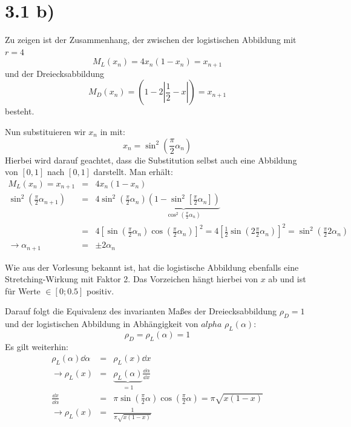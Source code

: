 \section*{3.1 b)}

Zu zeigen ist der Zusammenhang, der zwischen der logistischen Abbildung mit $r = 4$
\begin{equation}
 M_L(x_n) = 4x_n(1-x_n) = x_{n+1}
 \label{eqn:ml}
\end{equation}
und der Dreiecksabbildung
\begin{equation}
 \label{eqn:md}
 M_D(x_n) = \left(1-2\left|\frac{1}{2}-x\right|\right) = x_{n+1}
\end{equation}
besteht.

Nun substituieren wir $x_n$ in  mit:
\begin{equation}
 x_n = \sin^2\left(\frac{\pi}{2}\alpha_n\right)
\end{equation}
Hierbei wird darauf geachtet, dass die Substitution selbst auch eine Abbildung
von $[0, 1]$ nach $[0, 1]$ darstellt. Man erhält:
\begin{eqnarray}
 M_L(x_n) = x_{n+1} &=& 4x_n(1-x_n) \\
 \sin^2\left(\frac{\pi}{2}\alpha_{n+1}\right) &=& 4\sin^2\left(\frac{\pi}{2}\alpha_n\right)\underbrace{\left(1-\sin^2\left[\frac{\pi}{2}\alpha_n\right]\right)}_{\cos^2\left(\frac{\pi}{2}\alpha_n\right)} \\
 &=& 4\left[ \sin\left(\frac{\pi}{2}\alpha_n\right)\cos\left(\frac{\pi}{2}\alpha_n\right)\right]^2 = 4 \left[ \frac{1}{2} \sin\left( 2 \frac{\pi}{2} \alpha_n \right) \right]^2 = \sin^2\left(\frac{\pi}{2}2\alpha_n\right) \\
 \rightarrow \alpha_{n+1} &=& \pm 2 \alpha_n
\end{eqnarray}

Wie aus der Vorlesung bekannt ist, hat die logistische Abbildung ebenfalls eine
Stretching-Wirkung mit Faktor 2. Das Vorzeichen hängt hierbei von $x$ ab und ist
für Werte $\in [0; 0.5]$ positiv.

Darauf folgt die Equivalenz des invarianten Maßes der Dreiecksabbildung $ρ_D = 1$
und der logistischen Abbildung in Abhängigkeit von $alpha$ $ρ_L(α)$:
\begin{equation}
 ρ_D = ρ_L(α) = 1 
\end{equation}
Es gilt weiterhin:
\begin{eqnarray}
 ρ_L(α)\dd{α} &=& ρ_L(x)\dd{x} \\
  \rightarrow ρ_L(x) &=& \underbrace{ρ_L(α)}_{=1} \frac{\dd{\alpha}}{\dd{x}} \\
 \frac{\dd{x}}{\dd{α}} &=&  π \sin\left(\frac{\pi}{2}\alpha\right)\cos\left(\frac{\pi}{2}\alpha\right) = π\sqrt{x(1-x)} \\
 \rightarrow ρ_L(x) &=& \frac{1}{\pi\sqrt{x(1-x)}}
\end{eqnarray}

